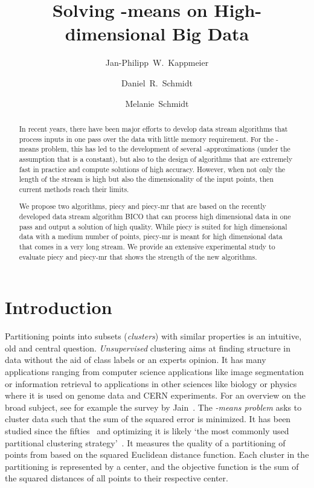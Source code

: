 \documentclass[a4paper]{scrartcl}
\author[1]{Jan-Philipp~W.~Kappmeier}
\author[2]{Daniel~R.~Schmidt}
\author[2]{Melanie~Schmidt}
\affil[1]{Technische Universität Berlin, Germany, \href{mailto:kappmeier@math.tu-berlin.de}{\texttt{kappmeier@math.tu-berlin.de}}   }
\affil[2]{Carnegie Mellon University, Pittsburgh PA, \texttt{\{\href{mailto:schmidtd@andrew.cmu.edu}{schmidtd},\href{mailto:mschmid1@andrew.cmu.edu}{mschmid1}\}@andrew.cmu.edu}}
\title{Solving -means on High-dimensional Big Data}
\begin{document}
\pagestyle{plain}
\maketitle              

\begin{abstract}
In recent years, there have been major efforts to develop data stream algorithms that process inputs in one pass over the data with little memory requirement. For the -means problem, this has led to the development of several -approximations (under the assumption that  is a constant), but also to the design of algorithms that are extremely fast in practice and compute solutions of high accuracy. However, when not only the length of the stream is high but also the dimensionality of the input points, then current methods reach their limits.

We propose two algorithms, piecy and piecy-mr that are based on the recently developed data stream algorithm BICO that can process high dimensional data in one pass and output a solution of high quality. While piecy is suited for high dimensional data with a medium number of points, piecy-mr is meant for high dimensional data that comes in a very long stream.
We provide an extensive experimental study to evaluate piecy and piecy-mr that shows the strength of the new algorithms.
\end{abstract}

\section{Introduction}
Partitioning points into subsets (\emph{clusters}) with similar properties is an intuitive, old and central question.
\emph{Unsupervised} clustering aims at finding structure in data without the aid of class labels or an experts opinion.
It has many applications ranging from computer science applications like image segmentation or information retrieval to applications in other sciences like biology or physics where it is used on genome data and CERN experiments.
For an overview on the broad subject, see for example the survey by Jain~\cite{J10}.
The \emph{-means problem} asks to cluster data such that the sum of the squared error is minimized.
It has been studied since the fifties~\cite{L57,S56} and optimizing it is likely \lq the most commonly used partitional clustering strategy\rq~\cite{JD88}.
It measures the quality of a partitioning of points from  based on the squared Euclidean distance function. Each cluster in the partitioning is represented by a center, and the objective function is the sum of the squared distances of all points to their respective center.
\end{document}
